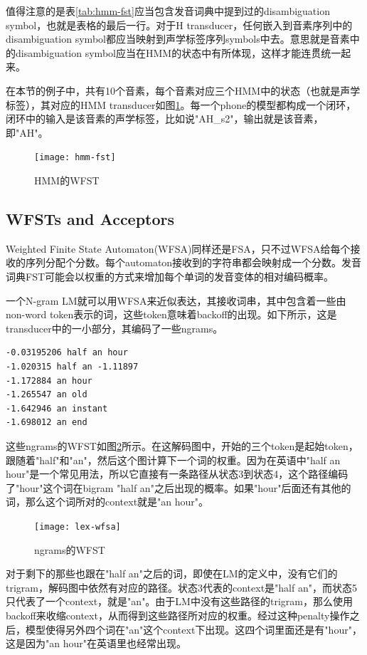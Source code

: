 {值得注意的是表\ref{tab:hmm-fst}应当包含发音词典中提到过的disambiguation symbol，也就是表格的最后一行。对于H transducer，任何嵌入到音素序列中的disambiguation symbol都应当映射到声学标签序列symbols中去。意思就是音素中的disambiguation symbol应当在HMM的状态中有所体现，这样才能连贯统一起来。

在本节的例子中，共有10个音素，每个音素对应三个HMM中的状态（也就是声学标签），其对应的HMM transducer如图\ref{fig:hmm-fst}。每一个phone的模型都构成一个闭环，闭环中的输入是该音素的声学标签，比如说"AH\_s2"，输出就是该音素，即"AH"。
\begin{figure}[htbp]
  \centering
  \texttt{[image: hmm-fst]}
  \caption{HMM的WFST\label{fig:hmm-fst}}
\end{figure}

\subsection{WFSTs and Acceptors}
\label{sub:wfst-acceptors}
Weighted Finite State Automaton(WFSA)同样还是FSA，只不过WFSA给每个接收的序列分配个分数。每个automaton接收到的字符串都会映射成一个分数。发音词典FST可能会以权重的方式来增加每个单词的发音变体的相对编码概率。

一个N-gram LM就可以用WFSA来近似表达，其接收词串，其中包含着一些由non-word token表示的词，这些token意味着backoff的出现。如下所示，这是transducer中的一小部分，其编码了一些ngrams。
\begin{lstlisting}[style=A]
-0.03195206 half an hour
-1.020315 half an -1.11897
-1.172884 an hour
-1.265547 an old
-1.642946 an instant
-1.698012 an end
\end{lstlisting}

这些ngrams的WFST如图\ref{fig:lex-wfsa}所示。在这解码图中，开始的三个token是起始token，跟随着"half"和"an"，然后这个图计算下一个词的权重。因为在英语中"half an hour"是一个常见用法，所以它直接有一条路径从状态3到状态4，这个路径编码了"hour"这个词在bigram "half an"之后出现的概率。如果"hour"后面还有其他的词，那么这个词所对的context就是"an hour"。
\begin{figure}[htbp]
  \centering
  \texttt{[image: lex-wfsa]}
  \caption{ngrams的WFST \label{fig:lex-wfsa}}
\end{figure}

对于剩下的那些也跟在"half an"之后的词，即使在LM的定义中，没有它们的trigram，解码图中依然有对应的路径。状态3代表的context是"half an"，而状态5只代表了一个context，就是"an"。由于LM中没有这些路径的trigram，那么使用backoff来收缩context，从而得到这些路径所对应的权重。经过这种penalty操作之后，模型使得另外四个词在"an"这个context下出现。这四个词里面还是有"hour"，这是因为"an hour"在英语里也经常出现。

}
